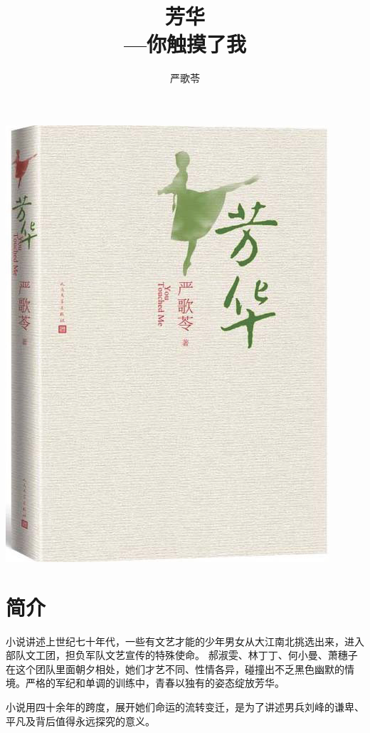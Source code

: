 \documentclass[12pt,twoside,openany]{book}
\title{芳华\\ \small---你触摸了我}
\author{严歌苓}
\date{}
\begin{document}
\maketitle

\begin{center}
	\includegraphics[width=0.8\linewidth]{FangHua.png}
\end{center}
\newpage
\tableofcontents
\chapter*{简介}
\noindent

小说讲述上世纪七十年代，一些有文艺才能的少年男女从大江南北挑选出来，进入部队文工团，担负军队文艺宣传的特殊使命。
郝淑雯、林丁丁、何小曼、萧穗子在这个团队里面朝夕相处，她们才艺不同、性情各异，碰撞出不乏黑色幽默的情境。严格的军纪和单调的训练中，青春以独有的姿态绽放芳华。

小说用四十余年的跨度，展开她们命运的流转变迁，是为了讲述男兵刘峰的谦卑、平凡及背后值得永远探究的意义。
\end{document}

